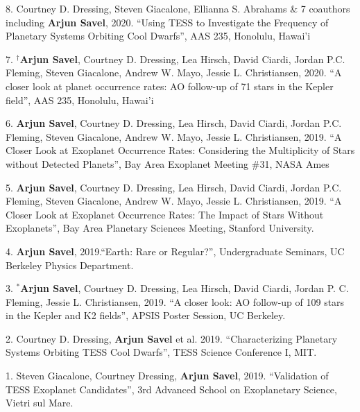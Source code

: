 \documentclass[12pt,letterpaper]{article}
\begin{document}
\begin{list}{}{\cvlist}

\item 8. Courtney D. Dressing, Steven Giacalone, Ellianna S. Abrahams \& 7 coauthors including \textbf{Arjun Savel}, 2020. ``Using TESS to Investigate the Frequency of Planetary Systems Orbiting Cool Dwarfs'', AAS 235, Honolulu, Hawai'i

\item 7. $^\dagger$\textbf{Arjun Savel}, Courtney D. Dressing, Lea Hirsch, David Ciardi, Jordan P.C. Fleming, Steven Giacalone, Andrew W. Mayo, Jessie L. Christiansen, 2020. “A closer look at planet occurrence rates: AO follow-up of 71 stars in the Kepler field”, AAS 235, Honolulu, Hawai'i

\item 6. \textbf{Arjun Savel}, Courtney D. Dressing, Lea Hirsch, David Ciardi, Jordan P.C. Fleming, Steven Giacalone, Andrew W. Mayo, Jessie L. Christiansen, 2019. “A Closer Look at Exoplanet Occurrence Rates: Considering the Multiplicity of Stars without Detected Planets”, Bay Area Exoplanet Meeting \#31, NASA Ames

\item 5. \textbf{Arjun Savel}, Courtney D. Dressing, Lea Hirsch, David Ciardi, Jordan P.C. Fleming, Steven Giacalone, Andrew W. Mayo, Jessie L. Christiansen, 2019. “A Closer Look at Exoplanet Occurrence Rates: The Impact of Stars Without Exoplanets”, Bay Area Planetary Sciences Meeting, Stanford University.

\item 4. \textbf{Arjun Savel}, 2019.“Earth: Rare or Regular?”, Undergraduate Seminars, UC Berkeley Physics Department.

\item 3. $^*$\textbf{Arjun Savel}, Courtney D. Dressing, Lea Hirsch, David Ciardi, Jordan P. C. Fleming, Jessie L. Christiansen, 2019. “A closer look: AO follow-up of 109 stars in the Kepler and K2 fields”, APSIS Poster Session, UC Berkeley.

\item 2. Courtney D. Dressing, \textbf{Arjun Savel} et al. 2019. “Characterizing Planetary Systems Orbiting TESS Cool Dwarfs”, TESS Science Conference I, MIT.

\item 1. Steven Giacalone, Courtney Dressing, \textbf{Arjun Savel}, 2019. “Validation of TESS Exoplanet Candidates”, 3rd Advanced School on Exoplanetary Science, Vietri sul Mare.

\end{list}
\end{document}
